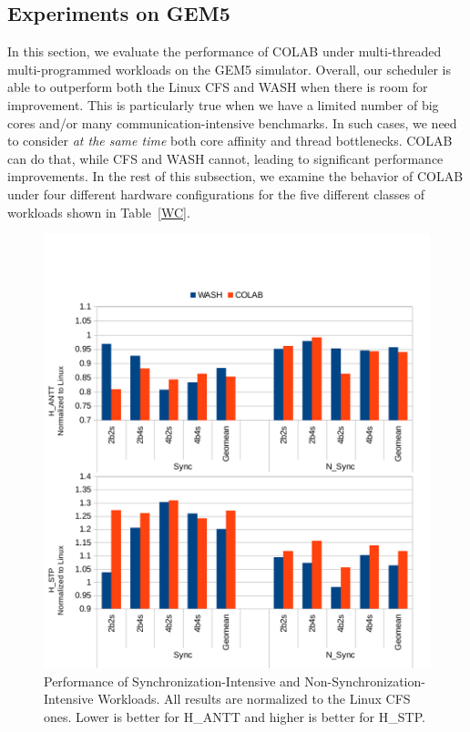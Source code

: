 \subsection{Experiments on GEM5}
In this section, we evaluate the performance of COLAB under multi-threaded multi-programmed workloads on the GEM5 simulator. Overall, our scheduler is able to outperform both the Linux CFS and WASH when there is room for improvement. This is particularly true when we have a limited number of big cores and/or many communication-intensive benchmarks. In such cases, we need to consider \emph{at the same time} both core affinity and thread bottlenecks. COLAB can do that, while CFS and WASH cannot, leading to significant performance improvements. In the rest of this subsection, we examine the behavior of COLAB under four different hardware configurations
for the five different classes of workloads shown in Table~\ref{WC}.

\begin{figure}
\centering
\includegraphics[scale=0.55]{figures/sync.pdf}
\caption{Performance of Synchronization-Intensive and Non-Synchronization-Intensive Workloads. All results are normalized to the Linux CFS ones. Lower is better for H\_ANTT and higher is better for H\_STP.}
\label{sync}
\end{figure} 

